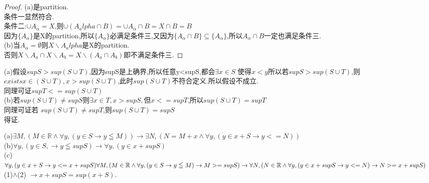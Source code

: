 \documentclass[a4paper, justified]{tufte-handout}
\begin{document}
\begin{problem}[UD Problem 11.10]
\end{problem}

\begin{proof}
  (a)是partition.\\
  条件一显然符合.\\
  条件二:$\cup A_\alpha = X$,则$\cup (A_alpha \cap B) = \cup A_\alpha \cap B = X \cap B = B$\\
  因为$\{A_\alpha\}$是X的partition,所以$\{A_\alpha\}$必满足条件三,又因为$\{A_\alpha \cap B\} \subseteq \{A_\alpha\}$,所以${A_\alpha \cap B}$一定也满足条件三.\\
  (b)当$A_\alpha = \emptyset$则${X \backslash A_alpha}$是X的partition.\\
  否则$X\backslash A_a \cap X\backslash A_b = X\backslash (A_a \cap A_b)$即不满足条件三.
\end{proof}

\begin{problem}[UD Problem 12.11 (a, b)]
\end{problem}

\begin{solution}
  (a)假设$supS > sup(S\cup T)$,因为supS是上确界,所以任意y<supS,都会$\exists x \in S$ 使得$x < y$所以若$supS > sup(S\cup T)$,则$exists x \in (S \cup T), x >  sup(S\cup T)$,此时$ sup(S\cup T)$不符合定义.所以假设不成立.\\
  同理可证$supT <= sup(S\cup T)$\\
  (b)若$sup(S \cup T) \neq supS$则$\exists x\in T,x >supS,但x<=supT$,所以$sup(S \cup T) = sup T$\\
  同理可证若 $sup(S \cup T) \neq supT$,则$sup(S \cup T) = sup S$\\
  得证.
\end{solution}

\begin{problem}[UD Problem 12.12]
\end{problem}

\begin{solution}
  (a)$\exists M, (M \in \mathbb{R} \land \forall y, (y \in S \rightarrow y\leqq M)) \rightarrow \exists N, (N = M + x \land \forall y, (y \in x + S \rightarrow y <= N))$\\
  (b)$\forall y,(y \in S, \rightarrow y\leqq sup S)\rightarrow \forall y, (y \in x + sup S)$\\
  (c)$\forall y,(y \in x + S \rightarrow y <= x + sup S)\\
    \forall M,(M \in \mathbb{R} \land\forall y, (y \in S \rightarrow y\leqq M) \rightarrow M >= supS)\\
    \rightarrow \forall N, (N \in \mathbb{R} \land \forall y, (y \in x + sup S \rightarrow y <= N) \rightarrow N>= x + sup S)$\\
  (1)$\land$(2) $\rightarrow x + sup S = sup(x + S).$
\end{solution}
\end{document}

